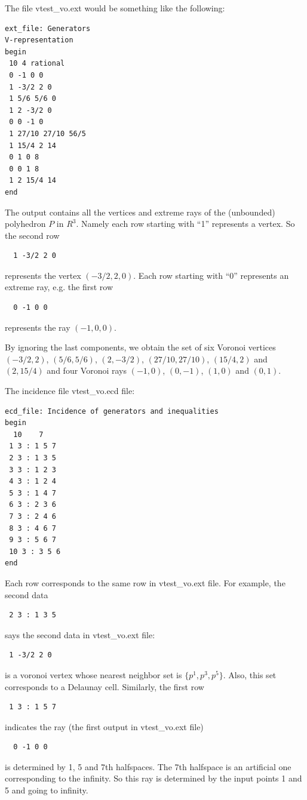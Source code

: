 \documentclass[[a4paper,12pt]{article}
\newcommand{\HBrule}{\noindent \hrulefill \medskip}
\newcommand{\HTrule}{\medskip \noindent \hrulefill}
\begin{document}
\begin{small}
The file vtest\_vo.ext would be something like the following:

\HTrule
\begin{verbatim}
ext_file: Generators
V-representation
begin
 10 4 rational
 0 -1 0 0
 1 -3/2 2 0
 1 5/6 5/6 0
 1 2 -3/2 0
 0 0 -1 0
 1 27/10 27/10 56/5
 1 15/4 2 14
 0 1 0 8
 0 0 1 8
 1 2 15/4 14
end
\end{verbatim}
\HBrule

The output contains all the vertices
and extreme rays of the (unbounded) polyhedron $P$ in $R^3$.
Namely each row starting with ``1'' represents a vertex.
So the second row 
\begin{verbatim}  1 -3/2 2 0\end{verbatim}
represents the vertex $(-3/2, 2, 0)$.  Each row starting
with ``0'' represents an extreme ray, e.g. the first row
\begin{verbatim}  0 -1 0 0 \end{verbatim}
represents the ray  $(-1, 0, 0)$.

By ignoring the last components, we obtain the set of six
Voronoi vertices $(-3/2, 2)$, $(5/6, 5/6)$, $(2, -3/2)$, $(27/10, 27/10)$,
$(15/4, 2)$ and $(2, 15/4)$ and four Voronoi rays
$(-1, 0)$, $(0, -1)$, $(1, 0)$ and $(0, 1)$.

The incidence file vtest\_vo.ecd file:

\HTrule
\begin{verbatim}
ecd_file: Incidence of generators and inequalities
begin
  10    7
 1 3 : 1 5 7 
 2 3 : 1 3 5 
 3 3 : 1 2 3 
 4 3 : 1 2 4 
 5 3 : 1 4 7 
 6 3 : 2 3 6 
 7 3 : 2 4 6 
 8 3 : 4 6 7 
 9 3 : 5 6 7 
 10 3 : 3 5 6 
end
\end{verbatim}
\HBrule

Each row corresponds to the same row in vtest\_vo.ext file.
For example, the second data 
\begin{verbatim} 2 3 : 1 3 5\end{verbatim}
says the second data in vtest\_vo.ext file:
\begin{verbatim} 1 -3/2 2 0  
\end{verbatim}
is a voronoi vertex whose nearest neighbor set
is $\{p^1, p^3, p^5\}$.  Also, this set corresponds
to a Delaunay cell.
Similarly, the first row
\begin{verbatim} 1 3 : 1 5 7\end{verbatim}
indicates the ray (the first output in vtest\_vo.ext file)
\begin{verbatim}  0 -1 0 0 \end{verbatim}
is determined by 1, 5 and 7th halfspaces.  The 7th halfspace
is an artificial one corresponding to the infinity.  So this ray
is determined by the input points 1 and 5 and going to infinity.


\end{small}
\end{document}
